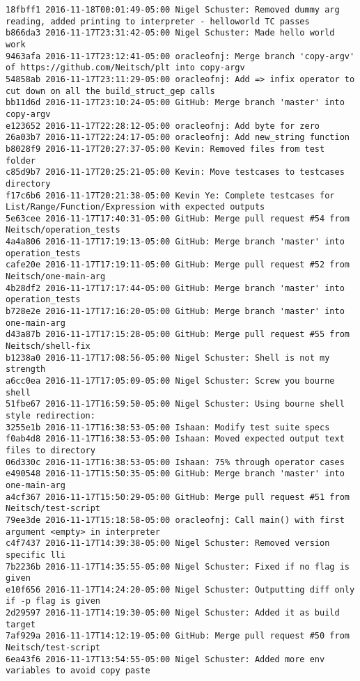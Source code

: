 \begin{lstlisting}
18fbff1 2016-11-18T00:01:49-05:00 Nigel Schuster: Removed dummy arg reading, added printing to interpreter - helloworld TC passes
b866da3 2016-11-17T23:31:42-05:00 Nigel Schuster: Made hello world work
9463afa 2016-11-17T23:12:41-05:00 oracleofnj: Merge branch 'copy-argv' of https://github.com/Neitsch/plt into copy-argv
54858ab 2016-11-17T23:11:29-05:00 oracleofnj: Add => infix operator to cut down on all the build_struct_gep calls
bb11d6d 2016-11-17T23:10:24-05:00 GitHub: Merge branch 'master' into copy-argv
e123652 2016-11-17T22:28:12-05:00 oracleofnj: Add byte for zero
26a03b7 2016-11-17T22:24:17-05:00 oracleofnj: Add new_string function
b8028f9 2016-11-17T20:27:37-05:00 Kevin: Removed files from test folder
c85d9b7 2016-11-17T20:25:21-05:00 Kevin: Move testcases to testcases directory
f17c6b6 2016-11-17T20:21:38-05:00 Kevin Ye: Complete testcases for List/Range/Function/Expression with expected outputs
5e63cee 2016-11-17T17:40:31-05:00 GitHub: Merge pull request #54 from Neitsch/operation_tests
4a4a806 2016-11-17T17:19:13-05:00 GitHub: Merge branch 'master' into operation_tests
cafe20e 2016-11-17T17:19:11-05:00 GitHub: Merge pull request #52 from Neitsch/one-main-arg
4b28df2 2016-11-17T17:17:44-05:00 GitHub: Merge branch 'master' into operation_tests
b728e2e 2016-11-17T17:16:20-05:00 GitHub: Merge branch 'master' into one-main-arg
d43a87b 2016-11-17T17:15:28-05:00 GitHub: Merge pull request #55 from Neitsch/shell-fix
b1238a0 2016-11-17T17:08:56-05:00 Nigel Schuster: Shell is not my strength
a6cc0ea 2016-11-17T17:05:09-05:00 Nigel Schuster: Screw you bourne shell
51fbe67 2016-11-17T16:59:50-05:00 Nigel Schuster: Using bourne shell style redirection:
3255e1b 2016-11-17T16:38:53-05:00 Ishaan: Modify test suite specs
f0ab4d8 2016-11-17T16:38:53-05:00 Ishaan: Moved expected output text files to directory
06d330c 2016-11-17T16:38:53-05:00 Ishaan: 75% through operator cases
e490548 2016-11-17T15:50:35-05:00 GitHub: Merge branch 'master' into one-main-arg
a4cf367 2016-11-17T15:50:29-05:00 GitHub: Merge pull request #51 from Neitsch/test-script
79ee3de 2016-11-17T15:18:58-05:00 oracleofnj: Call main() with first argument <empty> in interpreter
c4f7437 2016-11-17T14:39:38-05:00 Nigel Schuster: Removed version specific lli
7b2236b 2016-11-17T14:35:55-05:00 Nigel Schuster: Fixed if no flag is given
e10f656 2016-11-17T14:24:20-05:00 Nigel Schuster: Outputting diff only if -p flag is given
2d29597 2016-11-17T14:19:30-05:00 Nigel Schuster: Added it as build target
7af929a 2016-11-17T14:12:19-05:00 GitHub: Merge pull request #50 from Neitsch/test-script
6ea43f6 2016-11-17T13:54:55-05:00 Nigel Schuster: Added more env variables to avoid copy paste

\end{lstlisting}
